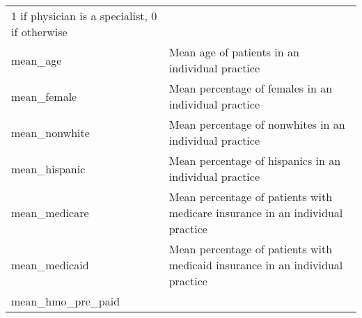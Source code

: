 \documentclass[
]{book}
\begin{document}
\begin{longtable}[]{@{}ll@{}}
\begin{minipage}[t]{0.76\columnwidth}
1 if physician is a specialist, 0 if otherwise\strut
\end{minipage}\tabularnewline
\begin{minipage}[t]{0.18\columnwidth}\raggedright
mean\_age\strut
\end{minipage} & \begin{minipage}[t]{0.76\columnwidth}\raggedright
Mean age of patients in an individual practice\strut
\end{minipage}\tabularnewline
\begin{minipage}[t]{0.18\columnwidth}\raggedright
mean\_female\strut
\end{minipage} & \begin{minipage}[t]{0.76\columnwidth}\raggedright
Mean percentage of females in an individual practice\strut
\end{minipage}\tabularnewline
\begin{minipage}[t]{0.18\columnwidth}\raggedright
mean\_nonwhite\strut
\end{minipage} & \begin{minipage}[t]{0.76\columnwidth}\raggedright
Mean percentage of nonwhites in an individual practice\strut
\end{minipage}\tabularnewline
\begin{minipage}[t]{0.18\columnwidth}\raggedright
mean\_hispanic\strut
\end{minipage} & \begin{minipage}[t]{0.76\columnwidth}\raggedright
Mean percentage of hispanics in an individual practice\strut
\end{minipage}\tabularnewline
\begin{minipage}[t]{0.18\columnwidth}\raggedright
mean\_medicare\strut
\end{minipage} & \begin{minipage}[t]{0.76\columnwidth}\raggedright
Mean percentage of patients with medicare insurance in an individual
practice\strut
\end{minipage}\tabularnewline
\begin{minipage}[t]{0.18\columnwidth}\raggedright
mean\_medicaid\strut
\end{minipage} & \begin{minipage}[t]{0.76\columnwidth}\raggedright
Mean percentage of patients with medicaid insurance in an individual
practice\strut
\end{minipage}\tabularnewline
\begin{minipage}[t]{0.18\columnwidth}\raggedright
mean\_hmo\_pre\_paid\strut

\end{minipage}
\end{longtable}
\end{document}

